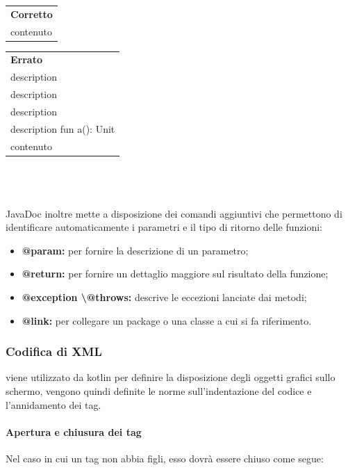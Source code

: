 \begin{minipage}{0.45\textwidth}
	\begin{tabular}{p{\textwidth}}		
		\textbf{Corretto}
		\begin{lstlisting}	
		/** fun()
		* description
		* description
		*/
		fun a():Unit {
		\\contenuto
		}	
		\end{lstlisting}
	\end{tabular}
\end{minipage}
\hfill
\begin{minipage}{0.45\textwidth}
	\begin{tabular}{|p{\textwidth}}		
		\textbf{Errato}
		\begin{lstlisting}
		\\description
		\\description
		\\description
		\\description
		fun a(): Unit {
		\\contenuto
		}
		\end{lstlisting}
	\end{tabular}
	
\end{minipage}
\\\\\\
JavaDoc inoltre mette a disposizione dei comandi aggiuntivi che permettono di identificare automaticamente i parametri e il tipo di ritorno delle funzioni:
\begin{itemize}
	\item \textbf{@param:} per fornire la descrizione di un parametro;
	\item \textbf{@return:} per fornire un dettaglio maggiore sul risultato della funzione;
	\item \textbf{@exception \textbackslash @throws:} descrive le eccezioni lanciate dai metodi;
	\item \textbf{@link:} per collegare un package o una classe a cui si fa riferimento.
\end{itemize}
\subsubsection{Codifica di XML}
viene utilizzato da kotlin per definire la disposizione degli oggetti grafici sullo schermo, vengono quindi definite le norme sull'indentazione del codice e l'annidamento dei tag.

\paragraph{Apertura e chiusura dei tag}
Nel caso in cui un tag non abbia figli, esso dovrà essere chiuso come segue:

